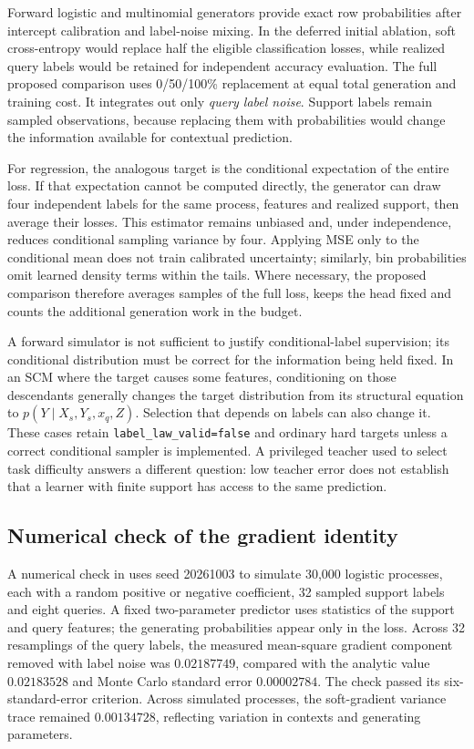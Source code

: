 \documentclass[11pt]{article}
\begin{document}
Forward logistic and multinomial generators provide exact row probabilities after intercept calibration and label-noise mixing. In the deferred initial ablation, soft cross-entropy would replace half the eligible classification losses, while realized query labels would be retained for independent accuracy evaluation. The full proposed comparison uses 0/50/100\% replacement at equal total generation and training cost. It integrates out only \emph{query label noise}. Support labels remain sampled observations, because replacing them with probabilities would change the information available for contextual prediction.

For regression, the analogous target is the conditional expectation of the entire loss. If that expectation cannot be computed directly, the generator can draw four independent labels for the same process, features and realized support, then average their losses. This estimator remains unbiased and, under independence, reduces conditional sampling variance by four. Applying MSE only to the conditional mean does not train calibrated uncertainty; similarly, bin probabilities omit learned density terms within the tails. Where necessary, the proposed comparison therefore averages samples of the full loss, keeps the head fixed and counts the additional generation work in the budget.

A forward simulator is not sufficient to justify conditional-label supervision; its conditional distribution must be correct for the information being held fixed. In an SCM where the target causes some features, conditioning on those descendants generally changes the target distribution from its structural equation to $p(Y\mid X_s,Y_s,x_q,Z)$. Selection that depends on labels can also change it. These cases retain \texttt{label\_law\_valid=false} and ordinary hard targets unless a correct conditional sampler is implemented. A privileged teacher used to select task difficulty answers a different question: low teacher error does not establish that a learner with finite support has access to the same prediction.

\subsection{Numerical check of the gradient identity}

A numerical check in  uses seed 20261003 to simulate 30,000 logistic processes, each with a random positive or negative coefficient, 32 sampled support labels and eight queries. A fixed two-parameter predictor uses statistics of the support and query features; the generating probabilities appear only in the loss. Across 32 resamplings of the query labels, the measured mean-square gradient component removed with label noise was $0.02187749$, compared with the analytic value $0.02183528$ and Monte Carlo standard error $0.00002784$. The check passed its six-standard-error criterion. Across simulated processes, the soft-gradient variance trace remained $0.00134728$, reflecting variation in contexts and generating parameters.
\end{document}
